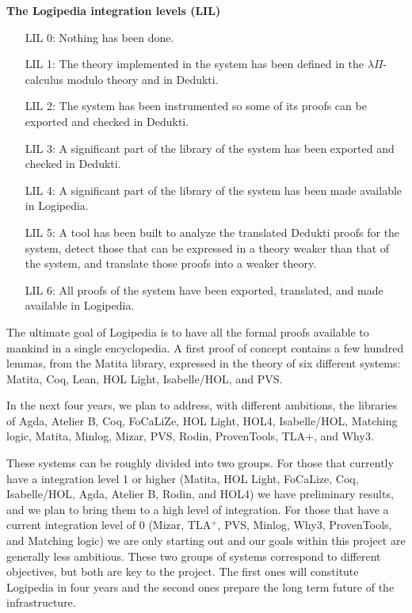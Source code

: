 \begin{framed}
  \vspace{-0.5cm}
\begin{center}
{\bf \Large The Logipedia integration levels (LIL)\label{lil}}
\end{center}

\begin{itemize}
\item[LIL 0:] Nothing has been done.

\item[LIL 1:] The theory implemented in the system has been defined in
  the $\lambda\Pi$-calculus modulo theory and in Dedukti.

\item[LIL 2:] The system has been instrumented so some of its proofs
  can be exported and checked in Dedukti.

\item[LIL 3:] A significant part of the library of the system has been
  exported and checked in Dedukti.

\item[LIL 4:] A significant part of the library of the system has
  been made available in Logipedia.

\item[LIL 5:] A tool has been built to analyze the translated Dedukti proofs
  for the system, detect those that can be expressed in a theory
  weaker than that of the system, and translate those proofs into a
  weaker theory.

\item[LIL 6:] All proofs of the system have been exported, translated,
  and made available in Logipedia.
\end{itemize}
\end{framed}

The ultimate goal of Logipedia is to have all the formal proofs
available to mankind in a single encyclopedia.  A first proof of
concept contains a few hundred lemmas, from the Matita library,
expressed in the theory of six different systems: Matita, Coq, Lean,
HOL Light, Isabelle/HOL, and PVS.

In the next four years, we plan to address, with different ambitions,
the libraries of Agda, Atelier B, Coq, FoCaLiZe, HOL Light, HOL4,
Isabelle/HOL, Matching logic, Matita, Minlog, Mizar, PVS, Rodin,
ProvenTools, TLA+, and Why3.

These systems can be roughly divided into two groups.  For those that
currently have a integration level 1 or higher (Matita, HOL Light,
FoCaLize, Coq, Isabelle/HOL, Agda, Atelier B, Rodin, and HOL4)
we have preliminary results, and we plan to bring them to a high level
of integration.  For those that have a current integration level of 0
(Mizar, TLA$^+$, PVS, Minlog, Why3, ProvenTools, and Matching logic) we are
only starting out and our goals within this project are generally less
ambitious.  These two groups of systems correspond to different
objectives, but both are key to the project. The first ones will
constitute Logipedia in four years and the second ones prepare the
long term future of the infrastructure.

